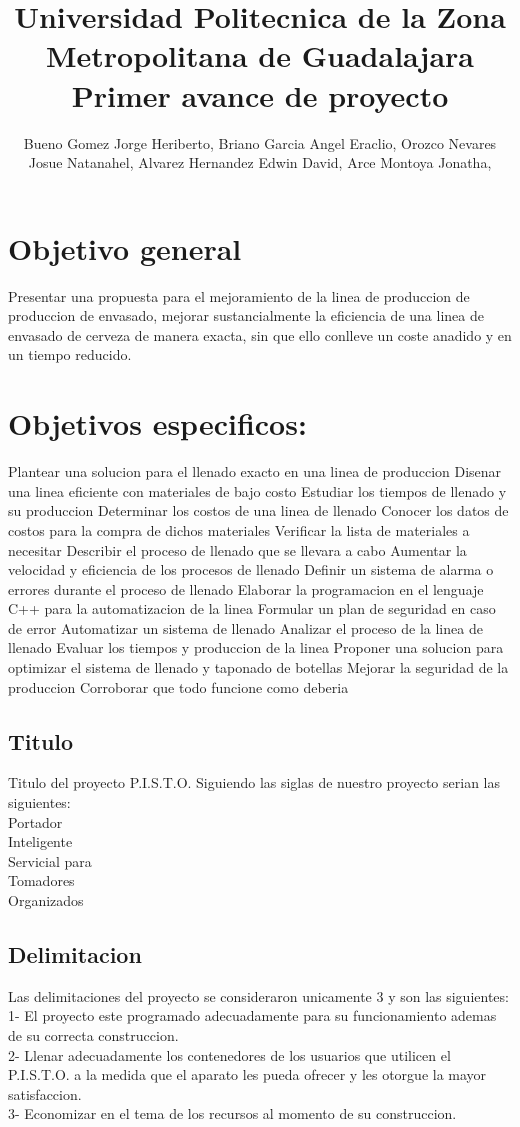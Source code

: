 \documentclass[12pt,a4paper]{report}
\author{Bueno Gomez Jorge Heriberto, Briano Garcia Angel Eraclio, Orozco Nevares Josue Natanahel, Alvarez Hernandez Edwin David, Arce Montoya Jonatha,}
\title{Universidad Politecnica de la Zona Metropolitana de Guadalajara\\
Primer avance de proyecto}
\begin{document}
\section{Objetivo general}
Presentar una propuesta para el mejoramiento de la linea de produccion de produccion de envasado, mejorar sustancialmente la eficiencia de una linea de envasado de cerveza de manera exacta, sin que ello conlleve un coste anadido y en un tiempo reducido.
\section{Objetivos especificos:}
Plantear una solucion para el llenado exacto en una linea de produccion
Disenar una linea eficiente con materiales de bajo costo
Estudiar los tiempos de llenado y su produccion 
Determinar los costos de una linea de llenado 
Conocer los datos de costos para la compra de dichos materiales
Verificar la lista de materiales a necesitar
Describir el proceso de llenado que se llevara a cabo
Aumentar la velocidad y eficiencia de los procesos de llenado
Definir un sistema de alarma o errores durante el proceso de llenado
Elaborar la programacion en el lenguaje C++ para la automatizacion de la linea 
Formular un plan de seguridad en caso de error
Automatizar un sistema de llenado
Analizar el proceso de la linea de llenado
Evaluar los tiempos y produccion de la linea 
Proponer una solucion para optimizar el sistema de llenado y taponado de botellas
Mejorar la seguridad de la produccion
Corroborar que todo funcione como deberia
\subsection{Titulo}
Titulo del proyecto
P.I.S.T.O. Siguiendo las siglas de nuestro proyecto serian las siguientes:\\
Portador\\
Inteligente\\
Servicial para\\
Tomadores\\
Organizados\\
\subsection{Delimitacion}
Las delimitaciones del proyecto se consideraron unicamente 3 y son las siguientes:\\
1- El proyecto este programado adecuadamente para su funcionamiento ademas de su correcta construccion.\\
2- Llenar adecuadamente los contenedores de los usuarios que utilicen el P.I.S.T.O. a la medida que el aparato les pueda ofrecer y les otorgue la mayor satisfaccion.\\
3- Economizar en el tema de los recursos al momento de su construccion.
\end{document}
